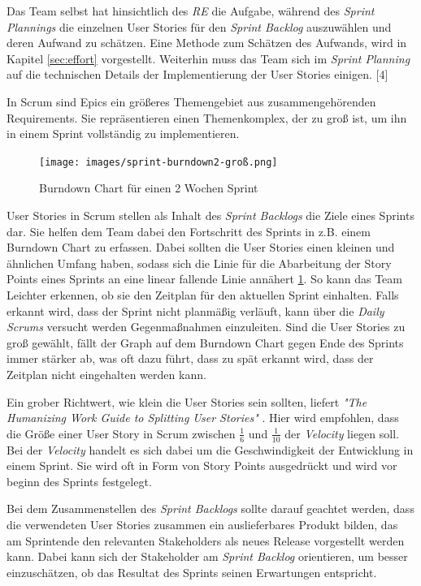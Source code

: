 \documentclass[acmtog]{acmart}
\begin{document}
Das Team selbst hat hinsichtlich des \emph{RE} die Aufgabe, während des \emph{Sprint Plannings} die einzelnen User Stories für den \emph{Sprint
	Backlog} auszuwählen und deren Aufwand zu schätzen. Eine Methode zum Schätzen des Aufwands, wird in Kapitel \ref{sec:effort} vorgestellt.
Weiterhin muss das Team sich im \emph{Sprint Planning} auf die technischen Details der Implementierung der User Stories einigen. [4]

In Scrum sind Epics ein größeres Themengebiet aus zusammengehörenden Requirements. Sie repräsentieren einen Themenkomplex, der
zu groß ist, um ihn in einem Sprint vollständig zu implementieren. \cite{reinscrum}

\begin{figure}[t]
	\centering
	\texttt{[image: images/sprint-burndown2-groß.png]}
	\caption{Burndown Chart für einen 2 Wochen Sprint}
	\label{fig:burndownchart}
	\Description{}
\end{figure}

User Stories in Scrum stellen als Inhalt des \emph{Sprint Backlogs} die Ziele eines Sprints dar. Sie helfen dem Team dabei den Fortschritt
des Sprints in z.B. einem Burndown Chart zu erfassen. Dabei sollten die User Stories einen kleinen und ähnlichen Umfang haben, sodass
sich die Linie für die Abarbeitung der Story Points eines Sprints an eine linear fallende Linie annähert \ref{fig:burndownchart}. So kann das
Team Leichter erkennen, ob sie den Zeitplan für den aktuellen Sprint einhalten. Falls erkannt wird, dass der Sprint nicht planmäßig
verläuft, kann über die \emph{Daily Scrums} versucht werden Gegenmaßnahmen einzuleiten. Sind die User Stories zu groß gewählt, fällt der
Graph auf dem Burndown Chart gegen Ende des Sprints immer stärker ab, was oft dazu führt, dass zu spät erkannt wird, dass der Zeitplan
nicht eingehalten werden kann. \cite{reinscrum}

Ein grober Richtwert, wie klein die User Stories sein sollten, liefert \emph{"The Humanizing Work Guide to Splitting User Stories"} \cite{humanizingwork}. Hier wird empfohlen, dass die Größe einer User Story in
Scrum zwischen \( \frac{1}{6} \) und \( \frac{1}{10} \) der \emph{Velocity} liegen soll. Bei der \emph{Velocity} handelt
es sich dabei um die Geschwindigkeit der Entwicklung in einem Sprint. Sie wird oft in Form von Story Points ausgedrückt und wird vor
beginn des Sprints festgelegt. \cite{humanizingwork}

Bei dem Zusammenstellen des \emph{Sprint Backlogs} sollte darauf geachtet werden, dass die verwendeten User Stories zusammen ein auslieferbares
Produkt bilden, das am Sprintende den relevanten Stakeholders als neues Release vorgestellt werden kann. Dabei kann sich der Stakeholder
am \emph{Sprint Backlog} orientieren, um besser einzuschätzen, ob das Resultat des Sprints seinen Erwartungen entspricht. \cite{reinscrum}
\end{document}
